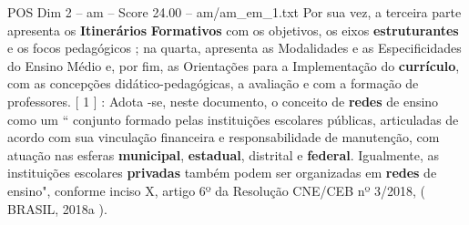 \begin{textsample}{POS Dim 2 – am – Score 24.00 – am/am\_em\_1.txt}
Por sua vez, a terceira parte apresenta os \textbf{Itinerários} \textbf{Formativos} com os objetivos, os eixos \textbf{estruturantes} e os focos pedagógicos ; na quarta, apresenta as Modalidades e as Especificidades do Ensino Médio e, por fim, as Orientações para a Implementação do \textbf{currículo}, com as concepções didático-pedagógicas, a avaliação e com a formação de professores. [ 1 ] : Adota -se, neste documento, o conceito de \textbf{redes} de ensino como um “ conjunto formado pelas instituições escolares públicas, articuladas de acordo com sua vinculação financeira e responsabilidade de manutenção, com atuação nas esferas \textbf{municipal}, \textbf{estadual}, distrital e \textbf{federal}.
Igualmente, as instituições escolares \textbf{privadas} também podem ser organizadas em \textbf{redes} de ensino", conforme inciso X, artigo 6º da Resolução CNE/CEB nº 3/2018, ( BRASIL, 2018a ).

\end{textsample}
